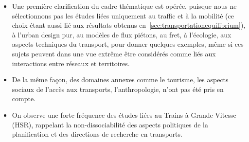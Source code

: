 {\begin{itemize}
\item Une première clarification du cadre thématique est opérée, puisque nous ne sélectionnons pas les études liées uniquement au traffic et à la mobilité (ce choix étant aussi lié aux résultats obtenus en~\ref{sec:transportationequilibrium}), à l'urban design pur, au modèles de flux piétons, au fret, à l'écologie, aux aspects techniques du transport, pour donner quelques exemples, même si ces sujets peuvent dans une vue extrême être considérés comme liés aux interactions entre réseaux et territoires.
\item De la même façon, des domaines annexes comme le tourisme, les aspects sociaux de l'accès aux transports, l'anthropologie, n'ont pas été pris en compte.
\item On observe une forte fréquence des études liées au Trains à Grande Vitesse (HSR), rappelant la non-dissociabilité des aspects politiques de la planification et des directions de recherche en transports.%
\end{itemize}
}


